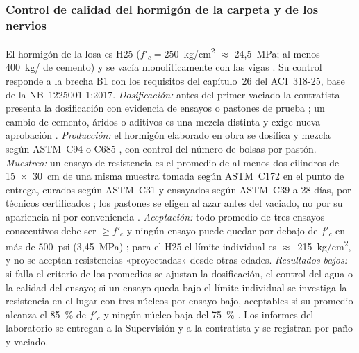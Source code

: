 \subsubsection{Control de calidad del hormigón de la carpeta y de los nervios} El hormigón de la losa es H25 ($f'_c = 250$~kg/cm\textsuperscript{2} $\approx$ 24,5~MPa; al menos 400~kg/\mtres{} de cemento) y se vacía monolíticamente con las vigas \parencite[pp.~3--4]{uatf_et}. Su control responde a la brecha B1 con los requisitos del capítulo~26 del ACI~318-25, base de la NB~1225001-1:2017. \emph{Dosificación:} antes del primer vaciado la contratista presenta la dosificación con evidencia de ensayos o pastones de prueba \parencite[sección 26.4.4.1]{aci318_2025}; un cambio de cemento, áridos o aditivos es una mezcla distinta y exige nueva aprobación \parencite[sección R26.4.3.1]{aci318_2025}. \emph{Producción:} el hormigón elaborado en obra se dosifica y mezcla según ASTM~C94 o C685 \parencite[sección 26.5.1.1]{aci318_2025}, con control del número de bolsas por pastón. \emph{Muestreo:} un ensayo de resistencia es el promedio de al menos dos cilindros de 15~$\times$~30~cm de una misma muestra tomada según ASTM~C172 en el punto de entrega, curados según ASTM~C31 y ensayados según ASTM~C39 a 28 días, por técnicos certificados \parencite[sección 26.12.1.1]{aci318_2025}; los pastones se eligen al azar antes del vaciado, no por su apariencia ni por conveniencia \parencite[sección R26.12.2.1]{aci318_2025}. \emph{Aceptación:} todo promedio de tres ensayos consecutivos debe ser $\geq f'_c$ y ningún ensayo puede quedar por debajo de $f'_c$ en más de 500~psi (3,45~MPa) \parencite[sección 26.12.3.1]{aci318_2025}; para el H25 el límite individual es $\approx$~215~kg/cm\textsuperscript{2}, y no se aceptan resistencias «proyectadas» desde otras edades. \emph{Resultados bajos:} si falla el criterio de los promedios se ajustan la dosificación, el control del agua o la calidad del ensayo; si un ensayo queda bajo el límite individual se investiga la resistencia en el lugar con tres núcleos por ensayo bajo, aceptables si su promedio alcanza el 85~\% de $f'_c$ y ningún núcleo baja del 75~\% \parencite[sección 26.12.7.1, p.~606]{aci318_2025}. Los informes del laboratorio se entregan a la Supervisión y a la contratista y se registran por paño y vaciado.

